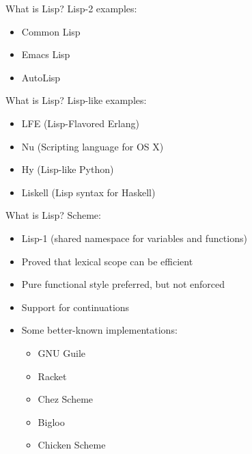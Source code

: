 \documentclass[pdf]{beamer}
\begin{document}
\begin{frame}{What is Lisp?}
  Lisp-2 examples:
  \pause
  \begin{itemize}
  \item Common Lisp
    \pause
  \item Emacs Lisp
    \pause
  \item AutoLisp
  \end{itemize}
\end{frame}

\begin{frame}{What is Lisp?}
  Lisp-like examples:
  \pause
  \begin{itemize}
  \item LFE (Lisp-Flavored Erlang)
    \pause
  \item Nu (Scripting language for OS X)
    \pause
  \item Hy (Lisp-like Python)
    \pause
  \item Liskell (Lisp syntax for Haskell)
    \pause
  \end{itemize}
\end{frame}

\begin{frame}{What is Lisp?}
  Scheme:
  \pause
  \begin{itemize}
  \item Lisp-1 (shared namespace for variables and functions)
    \pause
  \item Proved that lexical scope can be efficient
    \pause
  \item Pure functional style preferred, but not enforced
    \pause
  \item Support for continuations
    \pause
  \item Some better-known implementations:
    \pause
    \begin{itemize}
    \item GNU Guile
      \pause
    \item Racket
      \pause
    \item Chez Scheme
      \pause
    \item Bigloo
      \pause
    \item Chicken Scheme
    \end{itemize}
  \end{itemize}
\end{frame}
\end{document}
